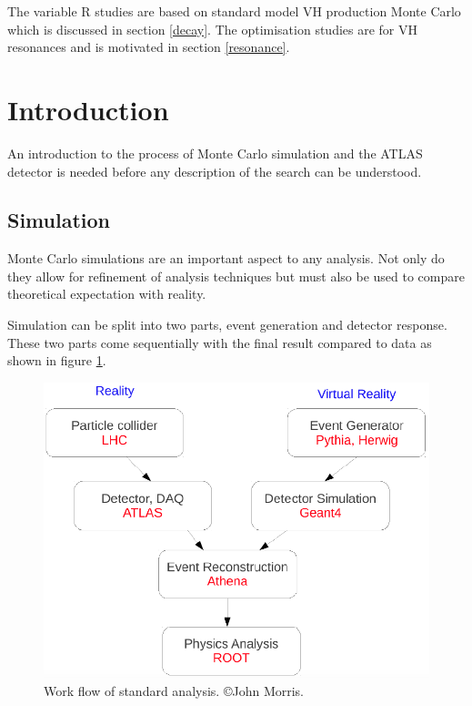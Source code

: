 The variable R studies are based on standard model VH production Monte Carlo which is discussed in section \ref{decay}. The optimisation studies are for VH resonances and is motivated in section \ref{resonance}.  
\section{Introduction}
An introduction to the process of Monte Carlo simulation and the ATLAS detector is needed before any description of the search can be understood.
\subsection{Simulation}
\label{section:Simulation}
Monte Carlo simulations are an important aspect to any analysis. Not only do they allow for refinement of analysis techniques but must also be used to compare theoretical expectation with reality.   

Simulation can be split into two parts, event generation and detector response. These two parts come sequentially with the final result compared to data as shown in figure \ref{fig:decays}. 

\begin{figure}[H]
\centering
\includegraphics[scale=0.3]{figures/MC-diagram.png}
\caption{Work flow of standard analysis. \copyright John Morris.}
\label{fig:decays}
\end{figure}


